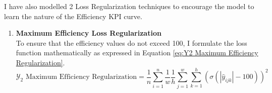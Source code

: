 \documentclass{report} %
\begin{document}
I have also modelled 2 Loss Regularization techniques to encourage the model to learn the nature of the Efficiency \ac{KPI} curve.
\begin{enumerate}
\item \textbf{Maximum Efficiency Loss Regularization} \\
To ensure that the efficiency values do not exceed 100, I formulate the loss function mathematically as expressed in Equation \ref{eq:Y2 Maximum Efficiency Regularization}.
\begin{equation}
\text{$\mathcal{Y}_2$ Maximum Efficiency Regularization} = \frac{1}{n} \sum_{i=1}^{n}\frac{1}{w} \frac{1}{h} \sum_{j=1}^{w} \sum_{k=1}^{h}\left(\sigma(|\hat{y}_{ijk}| - 100)\right)^2 
\label{eq:Y2 Maximum Efficiency Regularization}
\end{equation} 


\end{enumerate}
\end{document}
